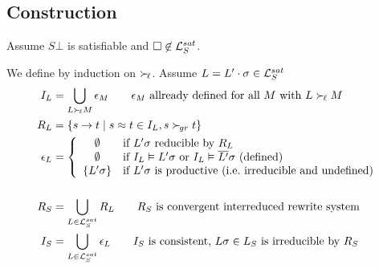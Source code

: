\documentclass[%
handout,
]{beamer}
\begin{document}
\subsection{Construction}
\begin{frame}
    Assume $S\bot$ is satisfiable and
    $\square\not\in\mathcal{L}_S^{sat}$.

    We define by induction on $\mathrel\succ_{\!\ell}$.
    Assume $L = L'\cdot\sigma \in\mathcal{L}_S^{sat}$
    \begin{align*}
        I_L &= \bigcup_{L\succL M}\epsilon_M
        \tag*{$\epsilon_M$ allready defined for all $M$ with $L\succL M$}
        \\
        R_L &= \{ s \to t \mid s\mEQ t\in I_L, s\succG t \}
        \\
        \epsilon_L &= \left\{
            \begin{array}{cl}
                \emptyset &\text{if }
                L'\sigma\text{ reducible by }R_L
                \\
                \emptyset &\text{if }
                I_L\vDash L'\sigma
                \text{ or }
                I_L\vDash \overline{L'}\sigma
                \text{ (defined)}
                \\
                \{ L'\sigma \}
                &\text{if }L'\sigma \text{ is productive (i.e.~irreducible and undefined)}
            \end{array}
        \right.\\[1.4em]
        R_S &= \bigcup_{L\in\mcL_S^{sat}} R_L \tag*{$R_S$ is convergent interreduced rewrite system}
        \\
        I_S &= \bigcup_{L\in\mcL_S^{sat}} \epsilon_L \tag*{$I_S$ is consistent, $L\sigma\in L_S$ is irreducible by $R_S$}
    \end{align*}
\end{frame}
\end{document}
